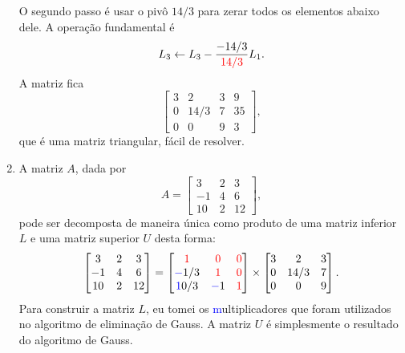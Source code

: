 \begin{ex}
\begin{sol}
\begin{enumerate}[label=\alph*)]
O segundo passo é usar o pivô $14/3$ para zerar todos os elementos abaixo dele. A operação fundamental é $$L_3\leftarrow L_3 - \frac{-14/3}{{\color{red}14/3}}L_1.$$
A matriz fica
$$\begin{bmatrix}
3			& 2 & 3 & 9 \\
0			& 14/3 & 7	& 35 \\
0			& 0 & 9 & 3 
\end{bmatrix},$$
que é uma matriz triangular, fácil de resolver.

\item A matriz $A$, dada por $$A=\begin{bmatrix}
3	&2	&3\\
-1	&4	&6\\
10	&2	&12
\end{bmatrix},$$
pode ser decomposta de maneira única como produto de uma matriz inferior $L$ e uma matriz superior $U$ desta forma:
$$\begin{bmatrix}
3	&2	&3\\
-1	&4	&6\\
10	&2	&12
\end{bmatrix}=
\begin{bmatrix}
{\textcolor{red}1}	&{\textcolor{red}0}	&{\textcolor{red}0}\\
{\textcolor{blue}-1/3 }	&{\textcolor{red}1}	&{\textcolor{red}0}\\
{\textcolor{blue} 10/3 }	&{\textcolor{blue}-1}	&{\textcolor{red}1}
\end{bmatrix}\times 
\begin{bmatrix}
3	&2	&3\\
0	&14/3	&7\\
0	&0	&9
\end{bmatrix}.$$
Para construir a matriz $L$, eu tomei os {\textcolor{blue} multiplicadores} que foram utilizados no algoritmo de eliminação de Gauss. A matriz $U$ é simplesmente o resultado do algoritmo de Gauss.



\end{enumerate}
\end{sol}
\end{ex}
